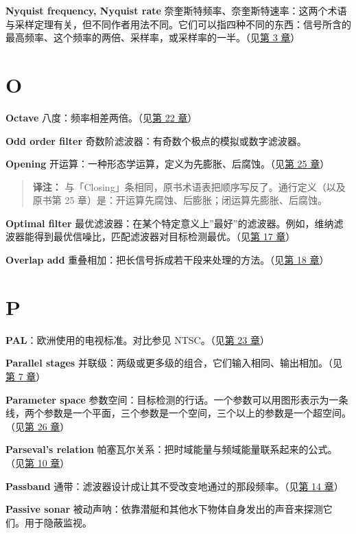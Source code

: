 \textbf{Nyquist frequency, Nyquist rate}
奈奎斯特频率、奈奎斯特速率：这两个术语与采样定理有关，但不同作者用法不同。它们可以指四种不同的东西：信号所含的最高频率、这个频率的两倍、采样率，或采样率的一半。（见\hyperref[ch-03]{第
3 章}）

\section{O}

\textbf{Octave} 八度：频率相差两倍。（见\hyperref[ch-22]{第 22 章}）

\textbf{Odd order filter} 奇数阶滤波器：有奇数个极点的模拟或数字滤波器。

\textbf{Opening}
开运算：一种形态学运算，定义为先膨胀、后腐蚀。（见\hyperref[ch-25]{第 25
章}）

\begin{quote}
\textbf{译注：}
与「Closing」条相同，原书术语表把顺序写反了。通行定义（以及原书第 25
章）是：开运算先腐蚀、后膨胀；闭运算先膨胀、后腐蚀。
\end{quote}

\textbf{Optimal filter}
最优滤波器：在某个特定意义上''最好''的滤波器。例如，维纳滤波器能得到最优信噪比，匹配滤波器对目标检测最优。（见\hyperref[ch-17]{第
17 章}）

\textbf{Overlap add}
重叠相加：把长信号拆成若干段来处理的方法。（见\hyperref[ch-18]{第 18
章}）

\section{P}

\textbf{PAL}：欧洲使用的电视标准。对比参见 NTSC。（见\hyperref[ch-23]{第
23 章}）

\textbf{Parallel stages}
并联级：两级或更多级的组合，它们输入相同、输出相加。（见\hyperref[ch-07]{第
7 章}）

\textbf{Parameter space}
参数空间：目标检测的行话。一个参数可以用图形表示为一条线，两个参数是一个平面，三个参数是一个空间，三个以上的参数是一个超空间。（见\hyperref[ch-26]{第
26 章}）

\textbf{Parseval's relation}
帕塞瓦尔关系：把时域能量与频域能量联系起来的公式。（见\hyperref[ch-10]{第
10 章}）

\textbf{Passband}
通带：滤波器设计成让其不受改变地通过的那段频率。（见\hyperref[ch-14]{第
14 章}）

\textbf{Passive sonar}
被动声呐：依靠潜艇和其他水下物体自身发出的声音来探测它们。用于隐蔽监视。

